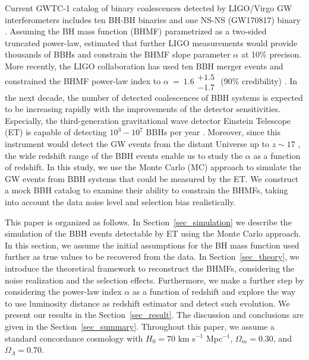 \documentclass[twocolumn]{aastex62}
\begin{document}
Current GWTC-1 catalog of binary coalescences detected by LIGO/Virgo GW interferometers includes ten BH-BH binaries and one NS-NS (GW170817) binary \citep{Abbott2018}.  Assuming the BH mass function (BHMF) parametrized as a two-sided truncated power-law, \citet{Kovetz2017PhRvD} estimated that further LIGO measurements would provide thousands of BBHs and constrain the BHMF slope parameter $\alpha$ at 10\% precison. More recently, the LIGO collaboration has used ten BBH merger events and constrained the BHMF power-law index to $\alpha~=~1.6\substack{+1.5\\-1.7}$ (90\% credibility) \citep{Abbott2018b}. 
In the next decade, the number of detected coalescences of BBH systems is expected to be increasing rapidly with the improvements of the detector sensitivities. Especially, the third-generation gravitational wave detector Einstein Telescope (ET) is capable of detecting $10^3-10^7$ BBHs per year \citep{Abernathy2011}. Moreover, since this instrument would detect the GW events from the distant Universe up to $z\sim17$ \citep{Abernathy2011}, the wide redshift range of the BBH events enable us to study the $\alpha$ as a function of redshift. In this study, we use the Monte Carlo (MC) approach to simulate the GW events from BBH systems that could be measured by the ET. We construct a mock BBH catalog to examine their ability to constrain the BHMFs, taking into account the data noise level and selection bias realistically.

This paper is organized as follows. In Section~\ref{sec_simulation} we describe the simulation of the BBH events detectable by ET using the Monte Carlo approach. In this section, we assume the initial assumptions for the BH mass function used further as true values to be recovered from the data. In Section~\ref{sec_theory}, we introduce the theoretical framework to reconstruct the BHMFs, considering the noise realization and the selection effects. Furthermore, we make a further step by considering the power-law index $\alpha$ as a function of redshift and explore the way to use luminosity distance as redshift estimator and detect such evolution. We present our results in the Section~\ref{sec_result}. The discussion and conclusions are given in the Section~\ref{sec_summary}. Throughout this paper, we assume a standard concordance cosmology with $H_0= 70$ km s$^{-1}$ Mpc$^{-1}$, $\Omega{_m} = 0.30$, and $\Omega{_\Lambda} = 0.70$.



\vspace{1cm}
\end{document}
